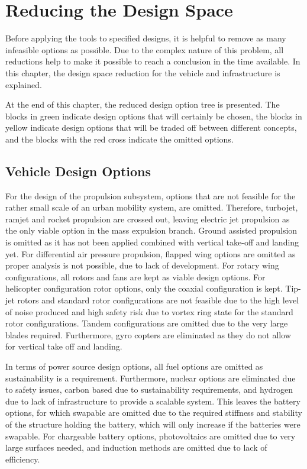 \newpage
\chapter{Reducing the Design Space}
\label{ch-DS}

Before applying the tools to specified designs, it is helpful to remove as many infeasible options as possible. Due to the complex nature of this problem, all reductions help to make it possible to reach a conclusion in the time available. In this chapter, the design space reduction for the vehicle and infrastructure is explained.

At the end of this chapter, the reduced design option tree is presented. The blocks in green indicate design options that will certainly be chosen, the blocks in yellow indicate design options that will be traded off between different concepts, and the blocks with the red cross indicate the omitted options.

\section{Vehicle Design Options}
\label{VehDesignOptions}
For the design of the propulsion subsystem, options that are not feasible for the rather small scale of an urban mobility system, are omitted. Therefore, turbojet, ramjet and rocket propulsion are crossed out, leaving electric jet propulsion as the only viable option in the mass expulsion branch. Ground assisted propulsion is omitted as it has not been applied combined with vertical take-off and landing yet. For differential air pressure propulsion, flapped wing options are omitted as proper analysis is not possible, due to lack of development. For rotary wing configurations, all rotors and fans are kept as viable design options. For helicopter configuration rotor options, only the coaxial configuration is kept. Tip-jet rotors and standard rotor configurations are not feasible due to the high level of noise produced and high safety risk due to vortex ring state for the standard rotor configurations. Tandem configurations are omitted due to the very large blades required. Furthermore, gyro copters are eliminated as they do not allow for vertical take off and landing. 

In terms of power source design options, all fuel options are omitted as sustainability is a requirement. Furthermore, nuclear options are eliminated due to safety issues, carbon based due to sustainability requirements, and hydrogen due to lack of infrastructure to provide a scalable system. This leaves the battery options, for which swapable are omitted due to the required stiffness and stability of the structure holding the battery, which will only increase if the batteries were swapable. For chargeable battery options, photovoltaics are omitted due to very large surfaces needed, and induction methods are omitted due to lack of efficiency.

